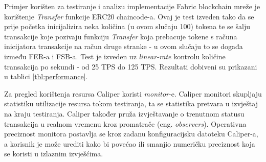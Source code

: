 \documentclass[times, utf8, diplomski]{fer}
\begin{document}
Primjer korišten za testiranje i analizu implementacije Fabric blockchain mreže je korištenje \textit{Transfer} funkcije ERC20 chaincode-a. Ovaj je test izveden tako da se prije početka inicijalizira neka količina (u ovom slučaju 100) tokena te se šalju transakcije koje pozivaju funkciju \textit{Transfer} koja prebacuje tokene s računa inicijatora transakcije na račun druge stranke - u ovom slučaju to se događa između FER-a i FSB-a.  Test je izveden uz \textit{linear-rate} kontrolu količine transakcija po sekundi - od 25 TPS do 125 TPS. Rezultati dobiveni su prikazani u tablici \ref{tbl:performance}.


\begin{table}[htb]
\centering
\caption{Performanse}
\label{tbl:performance}
\end{table}

Za pregled korištenja resursa Caliper koristi \textit{monitor}-e.  Caliper monitori skupljaju statistiku utilizacije resursa tokom testiranja,  ta se statistika pretvara u izvještaj na kraju testiranja. Caliper također pruža izvještavanje o trenutnom statusu transakcija u realnom vremenu kroz promatrače (eng. \textit{observers}).  Operativna preciznost monitora postavlja se kroz zadanu konfiguracijsku datoteku Caliper-a, a korisnik je može urediti kako bi povećao ili smanjio numeričku preciznost koja se koristi u izlaznim izvješćima.
\end{document}
